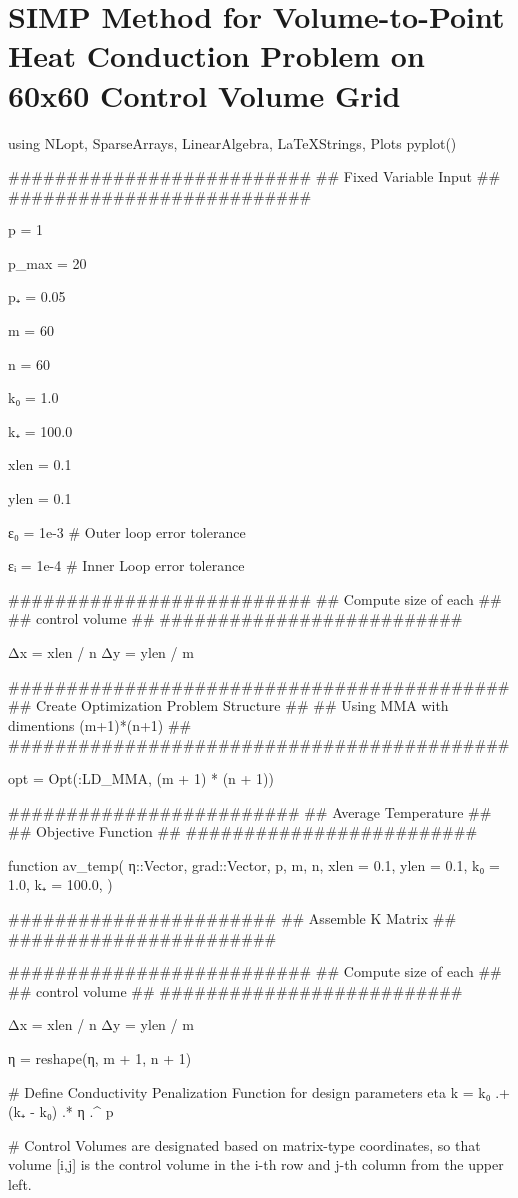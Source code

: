 \section{SIMP Method for Volume-to-Point Heat Conduction Problem on 60x60 Control Volume Grid}
\begin{jllisting}
using NLopt, SparseArrays, LinearAlgebra, LaTeXStrings, Plots
pyplot()

##########################
## Fixed Variable Input ##
##########################

p = 1

p_max = 20

p₊ = 0.05

m = 60

n = 60

k₀ = 1.0

k₊ = 100.0

xlen = 0.1

ylen = 0.1

ε₀ = 1e-3 # Outer loop error tolerance

εᵢ = 1e-4 # Inner Loop error tolerance

##########################
## Compute size of each ##
##   control volume     ##
##########################

Δx = xlen / n
Δy = ylen / m

###########################################
## Create Optimization Problem Structure ##
## Using MMA with dimentions (m+1)*(n+1) ##
###########################################

opt = Opt(:LD_MMA, (m + 1) * (n + 1))

#########################
## Average Temperature ##
## Objective Function  ##
#########################

function av_temp(
	η::Vector,
	grad::Vector,
	p,
	m,
	n,
	xlen = 0.1,
	ylen = 0.1,
	k₀ = 1.0,
	k₊ = 100.0,
)

	#######################
	## Assemble K Matrix ##
	#######################

	##########################
	## Compute size of each ##
	##   control volume     ##
	##########################

	Δx = xlen / n
	Δy = ylen / m

	η = reshape(η, m + 1, n + 1)

	# Define Conductivity Penalization Function for design parameters eta
	k = k₀ .+ (k₊ - k₀) .* η .^ p

	# Control Volumes are designated based on matrix-type coordinates, so that volume [i,j] is the control volume in the i-th row and j-th column from the upper left.


\end{jllisting}
